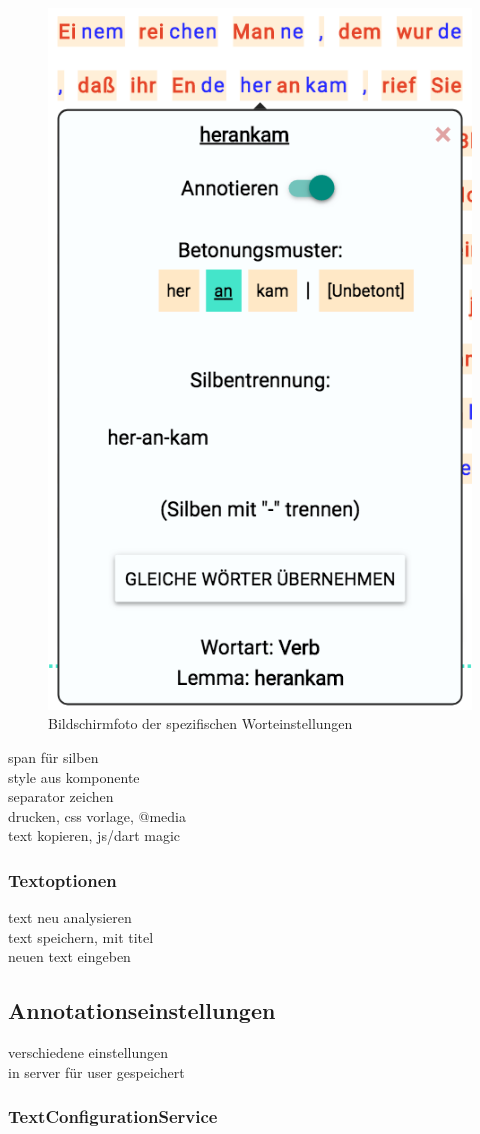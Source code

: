 \begin{figure}[h!]
	\centering
	\includegraphics[width=.4\linewidth, frame]{figures/frontend/wordpopup}
	\caption{Bildschirmfoto der spezifischen Worteinstellungen}
	\label{fig:frontend-wordconf}
\end{figure}

span für silben\\
style aus komponente\\
separator zeichen\\

drucken, css vorlage, @media\\
text kopieren, js/dart magic\\

\subsubsection{Textoptionen}

text neu analysieren\\
text speichern, mit titel\\
neuen text eingeben

\subsection{Annotationseinstellungen}

verschiedene einstellungen\\
in server für user gespeichert\\

\subsubsection{TextConfigurationService}

